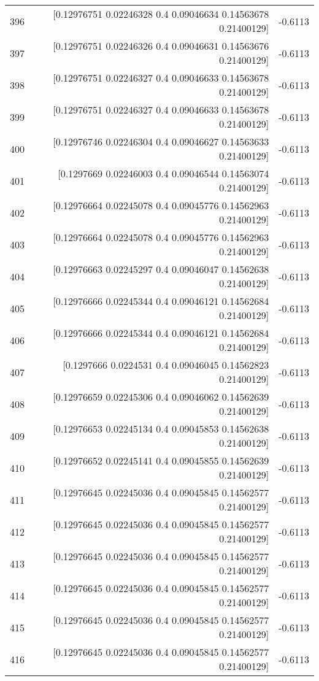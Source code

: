 \begin{longtable}{lrr}
396 & [0.12976751 0.02246328 0.4        0.09046634 0.14563678 0.21400129] & -0.6113 \\
397 & [0.12976751 0.02246326 0.4        0.09046631 0.14563676 0.21400129] & -0.6113 \\
398 & [0.12976751 0.02246327 0.4        0.09046633 0.14563678 0.21400129] & -0.6113 \\
399 & [0.12976751 0.02246327 0.4        0.09046633 0.14563678 0.21400129] & -0.6113 \\
400 & [0.12976746 0.02246304 0.4        0.09046627 0.14563633 0.21400129] & -0.6113 \\
401 & [0.1297669  0.02246003 0.4        0.09046544 0.14563074 0.21400129] & -0.6113 \\
402 & [0.12976664 0.02245078 0.4        0.09045776 0.14562963 0.21400129] & -0.6113 \\
403 & [0.12976664 0.02245078 0.4        0.09045776 0.14562963 0.21400129] & -0.6113 \\
404 & [0.12976663 0.02245297 0.4        0.09046047 0.14562638 0.21400129] & -0.6113 \\
405 & [0.12976666 0.02245344 0.4        0.09046121 0.14562684 0.21400129] & -0.6113 \\
406 & [0.12976666 0.02245344 0.4        0.09046121 0.14562684 0.21400129] & -0.6113 \\
407 & [0.1297666  0.0224531  0.4        0.09046045 0.14562823 0.21400129] & -0.6113 \\
408 & [0.12976659 0.02245306 0.4        0.09046062 0.14562639 0.21400129] & -0.6113 \\
409 & [0.12976653 0.02245134 0.4        0.09045853 0.14562638 0.21400129] & -0.6113 \\
410 & [0.12976652 0.02245141 0.4        0.09045855 0.14562639 0.21400129] & -0.6113 \\
411 & [0.12976645 0.02245036 0.4        0.09045845 0.14562577 0.21400129] & -0.6113 \\
412 & [0.12976645 0.02245036 0.4        0.09045845 0.14562577 0.21400129] & -0.6113 \\
413 & [0.12976645 0.02245036 0.4        0.09045845 0.14562577 0.21400129] & -0.6113 \\
414 & [0.12976645 0.02245036 0.4        0.09045845 0.14562577 0.21400129] & -0.6113 \\
415 & [0.12976645 0.02245036 0.4        0.09045845 0.14562577 0.21400129] & -0.6113 \\
416 & [0.12976645 0.02245036 0.4        0.09045845 0.14562577 0.21400129] & -0.6113 \\

\end{longtable}
